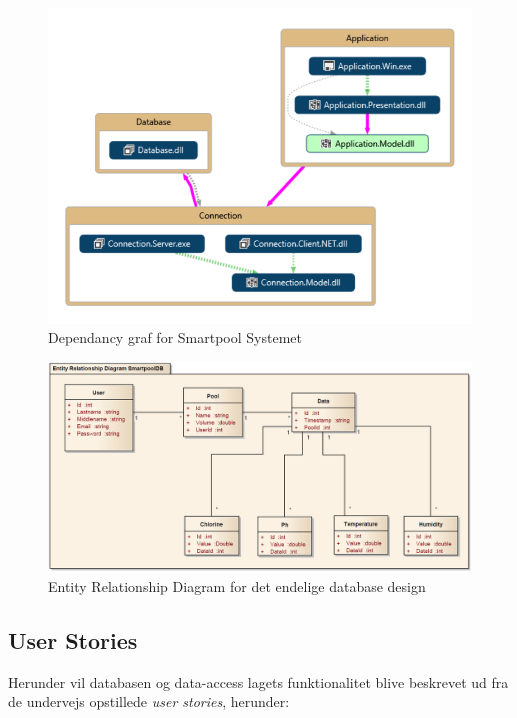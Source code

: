 \begin{figure}[h]
	\centering
	\includegraphics[width=0.8\linewidth]{figs/design/vs_codeMap.PNG}
	\caption{Dependancy graf for Smartpool Systemet}
	\label{fig:vs_codeMap}
\end{figure}

\begin{figure}
\centering
\includegraphics[width=0.7\linewidth]{figs/databaseERD_final_uml}
\caption{Entity Relationship Diagram for det endelige database design}
\label{fig:databaseERD_final_uml}
\end{figure}


\subsection{User Stories}
Herunder vil databasen og data-access lagets funktionalitet blive beskrevet ud fra de undervejs opstillede \textit{user stories}, herunder:

